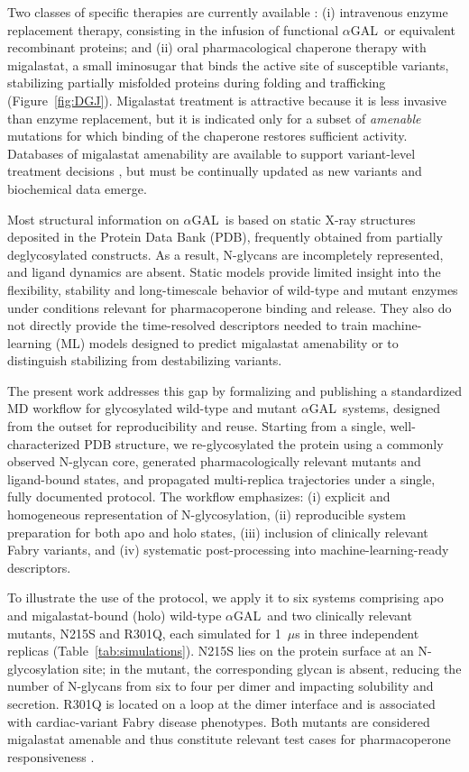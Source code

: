 \documentclass{article}
\newcommand{\agal}{$\alpha$GAL}
\begin{document}
Two classes of specific therapies are currently available \cite{nowicki_review_2024}:
(i) intravenous enzyme replacement therapy, consisting in the infusion of functional \agal\ or equivalent recombinant proteins; and
(ii) oral pharmacological chaperone therapy with migalastat, a small iminosugar that binds the active site of susceptible variants, stabilizing partially misfolded proteins during folding and trafficking (Figure~\ref{fig:DGJ}).
Migalastat treatment is attractive because it is less invasive than enzyme replacement, but it is indicated only for a subset of \emph{amenable} mutations for which binding of the chaperone restores sufficient activity.
Databases of migalastat amenability are available to support variant-level treatment decisions \cite{amenability}, but must be continually updated as new variants and biochemical data emerge.

Most structural information on \agal\ is based on static X-ray structures deposited in the Protein Data Bank (PDB), frequently obtained from partially deglycosylated constructs.
As a result, N-glycans are incompletely represented, and ligand dynamics are absent.
Static models provide limited insight into the flexibility, stability and long-timescale behavior of wild-type and mutant enzymes under conditions relevant for pharmacoperone binding and release.
They also do not directly provide the time-resolved descriptors needed to train machine-learning (ML) models designed to predict migalastat amenability or to distinguish stabilizing from destabilizing variants.

The present work addresses this gap by formalizing and publishing a standardized MD workflow for glycosylated wild-type and mutant \agal\ systems, designed from the outset for reproducibility and reuse.
Starting from a single, well-characterized PDB structure, we re-glycosylated the protein using a commonly observed N-glycan core, generated pharmacologically relevant mutants and ligand-bound states, and propagated multi-replica trajectories under a single, fully documented protocol.
The workflow emphasizes: (i) explicit and homogeneous representation of N-glycosylation, (ii) reproducible system preparation for both apo and holo states, (iii) inclusion of clinically relevant Fabry variants, and (iv) systematic post-processing into machine-learning-ready descriptors.

To illustrate the use of the protocol, we apply it to six systems comprising apo and migalastat-bound (holo) wild-type \agal\ and two clinically relevant mutants, N215S and R301Q, each simulated for 1~$\mu$s in three independent replicas (Table~\ref{tab:simulations}).
N215S lies on the protein surface at an N-glycosylation site; in the mutant, the corresponding glycan is absent, reducing the number of N-glycans from six to four per dimer and impacting solubility and secretion.
R301Q is located on a loop at the dimer interface and is associated with cardiac-variant Fabry disease phenotypes.
Both mutants are considered migalastat amenable and thus constitute relevant test cases for pharmacoperone responsiveness \cite{oder_-galactosidase_2017, sheng_two_2020, kugan_fabry_2024,fan_accelerated_1999, ishii_mutant_2007, brady_diagnosing_2015}.
\end{document}
